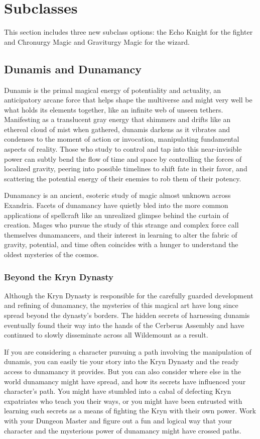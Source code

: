 \documentclass[10pt,a4paper,twoside,bg=print,twocolumn,openany,nodeprecatedcode]{dndbook}
\begin{document}
\section{Subclasses}
This section includes three new subclass options: the Echo Knight for the fighter and Chronurgy Magic and Graviturgy Magic for the wizard.

\subsection{Dunamis and Dunamancy}
Dunamis is the primal magical energy of potentiality and actuality, an anticipatory arcane force that helps shape the multiverse and might very well be what holds its elements together, like an infinite web of unseen tethers. Manifesting as a translucent gray energy that shimmers and drifts like an ethereal cloud of mist when gathered, dunamis darkens as it vibrates and condenses to the moment of action or invocation, manipulating fundamental aspects of reality. Those who study to control and tap into this near-invisible power can subtly bend the flow of time and space by controlling the forces of localized gravity, peering into possible timelines to shift fate in their favor, and scattering the potential energy of their enemies to rob them of their potency.

Dunamancy is an ancient, esoteric study of magic almost unknown across Exandria. Facets of dunamancy have quietly bled into the more common applications of spellcraft like an unrealized glimpse behind the curtain of creation. Mages who pursue the study of this strange and complex force call themselves dunamancers, and their interest in learning to alter the fabric of gravity, potential, and time often coincides with a hunger to understand the oldest mysteries of the cosmos.

\subsubsection{Beyond the Kryn Dynasty}
Although the Kryn Dynasty is responsible for the carefully guarded development and refining of dunamancy, the mysteries of this magical art have long since spread beyond the dynasty's borders. The hidden secrets of harnessing dunamis eventually found their way into the hands of the Cerberus Assembly and have continued to slowly disseminate across all Wildemount as a result.

If you are considering a character pursuing a path involving the manipulation of dunamis, you can easily tie your story into the Kryn Dynasty and the ready access to dunamancy it provides. But you can also consider where else in the world dunamancy might have spread, and how its secrets have influenced your character's path. You might have stumbled into a cabal of defecting Kryn expatriates who teach you their ways, or you might have been entrusted with learning such secrets as a means of fighting the Kryn with their own power. Work with your Dungeon Master and figure out a fun and logical way that your character and the mysterious power of dunamancy might have crossed paths.
\end{document}
